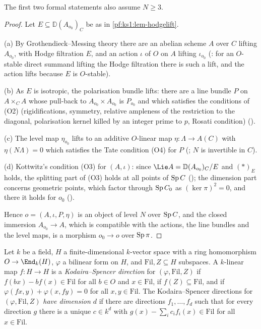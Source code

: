 The first two formal statements also assume $N\ge3$.

\begin{proof}
Let $E\subseteq\mathbb D(A_{o_0})_C$ be as in \cref{pf:ks1:lem-hodgelift}.

(a) By Grothendieck--Messing theory there are an abelian scheme $A$ over $C$ lifting $A_{o_0}$, with Hodge filtration $E$, and an action $\iota$ of $O$
on $A$ lifting $\iota_{o_0}$ (: for an $O$-stable direct summand lifting
the Hodge filtration there is such a lift, and the action lifts because $E$ is $O$-stable).

(b) As $E$ is isotropic, the polarisation bundle lifts: there are a line bundle $P$ on $A\times_CA$ whose pull-back to $A_{o_0}\times A_{o_0}$ is
$P_{o_0}$ and which satisfies the conditions of (O2) (rigidifications, symmetry, relative ampleness of the restriction to the diagonal, polarisation
kernel killed by an integer prime to $p$, Rosati condition) ().

(c) The level map $\eta_{o_0}$ lifts to an additive $O$-linear map $\eta:\Lambda\to A(C)$ with $\eta(N\Lambda)=0$ which satisfies the Tate condition (O4)
for $P$ (; $N$ is invertible in $C$).

(d) Kottwitz's condition (O3) for $(A,\iota)$: since $\Lie A=\mathbb D(A_{o_0})_C/E$ and $(*)_E$ holds, the splitting part of (O3) holds at all points of
$\operatorname{Sp} C$ (); the dimension part concerns geometric points, which factor
through $\operatorname{Sp} C_0$ as $(\ker\pi)^2=0$, and there it holds for $o_0$ ().

Hence $o=(A,\iota,P,\eta)$ is an object of level $N$ over $\operatorname{Sp} C$, and the closed immersion $A_{o_0}\to A$, which is compatible with the actions,
the line bundles and the level maps, is a morphism $o_0\to o$ over $\operatorname{Sp}\pi$.
\end{proof}

\begin{definition}\label{pf:ks1:def-ksdir}
Let $k$ be a field, $H$ a finite-dimensional $k$-vector space with a ring homomorphism $O\to\End_k(H)$, $\varphi$ a bilinear form on $H$, and
$\mathrm{Fil},Z\subseteq H$ subspaces. A $k$-linear map $f:H\to H$ is a \emph{Kodaira--Spencer direction} for $(\varphi,\mathrm{Fil},Z)$ if
$f(bx)-bf(x)\in\mathrm{Fil}$ for all $b\in O$ and $x\in\mathrm{Fil}$, if $f(Z)\subseteq\mathrm{Fil}$, and if $\varphi(fx,y)+\varphi(x,fy)=0$ for all
$x,y\in\mathrm{Fil}$. The Kodaira--Spencer directions for $(\varphi,\mathrm{Fil},Z)$ \emph{have dimension $d$} if there are directions $f_1,\dots,f_d$
such that for every direction $g$ there is a unique $c\in k^d$ with $g(x)-\sum_ic_if_i(x)\in\mathrm{Fil}$ for all $x\in\mathrm{Fil}$.
\end{definition}

